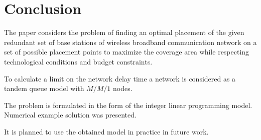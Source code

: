\section{Conclusion}
The paper considers the problem of finding an optimal placement of the given redundant set of base stations of wireless broadband communication network on a set of possible placement points to maximize the coverage area while respecting technological conditions and budget constraints.

To calculate a limit on the network delay time a network is considered as a tandem queue model with $M/M/1$  nodes.

The problem is formulated in the form of the integer linear programming model. Numerical example solution was presented.

It is planned to use the obtained model in practice in future work.


% 
% 

% 





